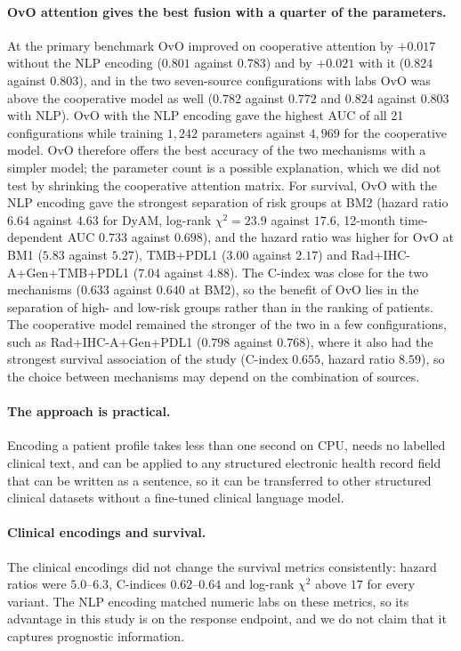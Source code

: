 \paragraph{OvO attention gives the best fusion with a quarter of the parameters.}
At the primary benchmark OvO improved on cooperative attention by $+0.017$ without the NLP encoding ($0.801$ against $0.783$)
and by $+0.021$ with it ($0.824$ against $0.803$), and in the two seven-source configurations with labs OvO was above
the cooperative model as well ($0.782$ against $0.772$ and $0.824$ against $0.803$ with NLP).
OvO with the NLP encoding gave the highest AUC of all 21 configurations while training $1{,}242$ parameters against
$4{,}969$ for the cooperative model. OvO therefore offers the best accuracy of the two mechanisms with a simpler model;
the parameter count is a possible explanation, which we did not test by shrinking the cooperative attention matrix.
For survival, OvO with the NLP encoding gave the strongest separation of risk groups at BM2 (hazard ratio $6.64$
against $4.63$ for DyAM, log-rank $\chi^2 = 23.9$ against $17.6$, 12-month time-dependent AUC $0.733$ against $0.698$),
and the hazard ratio was higher for OvO at BM1 ($5.83$ against $5.27$), TMB+PDL1 ($3.00$ against $2.17$) and
Rad+IHC-A+Gen+TMB+PDL1 ($7.04$ against $4.88$). The C-index was close for the two mechanisms ($0.633$ against $0.640$ at BM2),
so the benefit of OvO lies in the separation of high- and low-risk groups rather than in the ranking of patients.
The cooperative model remained the stronger of the two in a few configurations, such as Rad+IHC-A+Gen+PDL1
($0.798$ against $0.768$), where it also had the strongest survival association of the study (C-index $0.655$, hazard ratio $8.59$),
so the choice between mechanisms may depend on the combination of sources.

\paragraph{The approach is practical.}
Encoding a patient profile takes less than one second on CPU, needs no labelled clinical text, and can be applied to any
structured electronic health record field that can be written as a sentence, so it can be transferred to other structured
clinical datasets without a fine-tuned clinical language model.

\paragraph{Clinical encodings and survival.}
The clinical encodings did not change the survival metrics consistently: hazard ratios were $5.0$--$6.3$, C-indices $0.62$--$0.64$ and
log-rank $\chi^2$ above $17$ for every variant. The NLP encoding matched numeric labs on these metrics, so its advantage in this study is on the
response endpoint, and we do not claim that it captures prognostic information.


